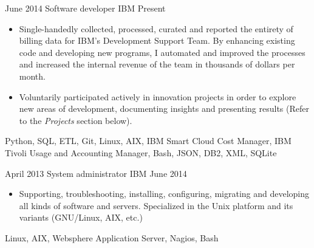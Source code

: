 %
%
%


\begin{experiences}
    \experience
        {June 2014}
        {Software developer}
        {IBM}
        {Present}
        {
            \begin{itemize}
                \item Single-handedly collected, processed, curated and 
                    reported the entirety of billing data for IBM's Development 
                    Support Team. By enhancing existing code and developing new 
                    programs, I automated and improved the processes and 
                    increased the internal revenue of the team in thousands of 
                    dollars per month.
                \item Voluntarily participated actively in innovation projects 
                    in order to explore new areas of development, documenting 
                    insights and presenting results (Refer to the 
                    \emph{Projects} section below).
            \end{itemize}
        }
        {
            Python,
            SQL,
            ETL,
            Git,
            Linux,
            AIX,
            IBM Smart Cloud Cost Manager,
            IBM Tivoli Usage and Accounting Manager,
            Bash,
            JSON,
            DB2,
            XML,
            SQLite
        }

    \emptySeparator

    \experience
        {April 2013}
        {System administrator}
        {IBM}
        {June 2014}
        {
            \begin{itemize}
                \item Supporting, troubleshooting, installing, configuring, 
                    migrating and developing all kinds of software and servers. 
                    Specialized in the Unix platform and its variants 
                    (GNU/Linux, AIX, etc.)
            \end{itemize}
        }
        {
            Linux,
            AIX,
            Websphere Application Server,
            Nagios,
            Bash
        }


\end{experiences}
